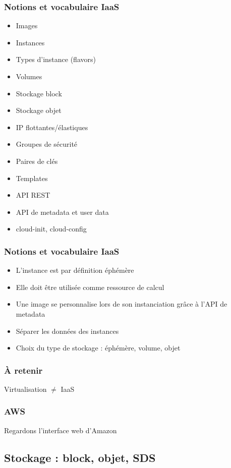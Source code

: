   \begin{frame}
    \frametitle{Notions et vocabulaire IaaS}
    \begin{itemize}
      \item Images
      \item Instances
      \item Types d'instance (flavors)
      \item Volumes\pause
      \item Stockage block
      \item Stockage objet\pause
      \item IP flottantes/élastiques\pause
      \item Groupes de sécurité\pause
      \item Paires de clés\pause
      \item Templates\pause
      \item API REST\pause
      \item API de metadata et user data
      \item cloud-init, cloud-config
    \end{itemize}
  \end{frame}

  \begin{frame}
    \frametitle{Notions et vocabulaire IaaS}
    \begin{itemize}
      \item L'instance est par définition éphémère
      \item Elle doit être utilisée comme ressource de calcul
      \item Une image se personnalise lors de son instanciation grâce à l'API de metadata
      \item Séparer les données des instances
      \item Choix du type de stockage : éphémère, volume, objet
    \end{itemize}
  \end{frame}

  \begin{frame}
    \frametitle{À retenir}
    \Huge{Virtualisation $\ne$ IaaS}
  \end{frame}

  \begin{frame}
    \frametitle{AWS}
    \huge{Regardons l'interface web d'Amazon}
  \end{frame}

  \subsection[Stockage]{Stockage : block, objet, SDS}

